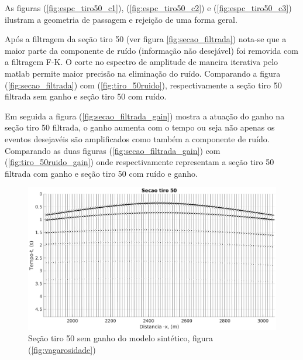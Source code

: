 As figuras (\ref{fig:espc_tiro50_c1}), (\ref{fig:espc_tiro50_c2}) e (\ref{fig:espc_tiro50_c3}) ilustram a geometria de passagem e rejeição de uma forma geral.

Após a filtragem da seção tiro 50 (ver figura \ref{fig:secao_filtrada}) nota-se que a maior parte da componente de ruído (informação não desejável) foi removida com a filtragem F-K. O corte no espectro de amplitude de maneira iterativa pelo matlab permite maior precisão na eliminação do ruído. Comparando a figura (\ref{fig:secao_filtrada}) com (\ref{fig:tiro_50ruido}), respectivamente a seção tiro 50 filtrada sem ganho e seção tiro 50 com ruído.

Em seguida a figura (\ref{fig:secao_filtrada_gain}) mostra a atuação do ganho na seção tiro 50 filtrada, o ganho aumenta com o tempo ou seja não apenas os eventos desejavéis são amplificados como também a componente de ruído. Comparando as duas figuras (\ref{fig:secao_filtrada_gain}) com (\ref{fig:tiro_50ruido_gain}) onde respectivamente representam a seção tiro 50 filtrada com ganho e seção tiro 50 com ruído e ganho. 

\begin{landscape}
\begin{figure}[H]
\centering
\includegraphics[totalheight=14cm]{figuras/cap3/secao_tiro50.eps}
\caption{Seção tiro 50 sem ganho do modelo sintético, figura (\ref{fig:vagarosidade})}
\label{fig:tiro_50}
\end{figure}
\end{landscape}

